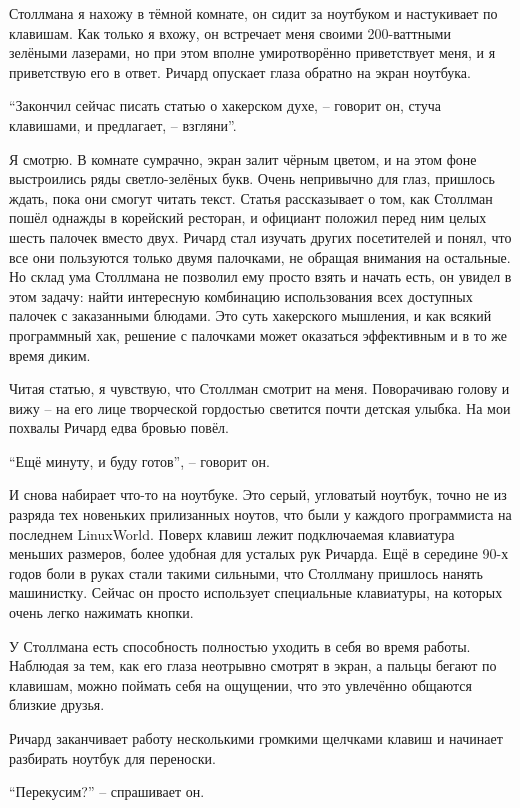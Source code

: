 Столлмана я нахожу в тёмной комнате, он сидит за ноутбуком и настукивает по клавишам. Как только я вхожу, он встречает меня своими 200-ваттными зелёными лазерами, но при этом вполне умиротворённо приветствует меня, и я приветствую его в ответ. Ричард опускает глаза обратно на экран ноутбука.

\enquote{Закончил сейчас писать статью о хакерском духе, -- говорит он, стуча клавишами, и предлагает, -- взгляни}.

Я смотрю. В комнате сумрачно, экран залит чёрным цветом, и на этом фоне выстроились ряды светло-зелёных букв. Очень непривычно для глаз, пришлось ждать, пока они смогут читать текст. Статья рассказывает о том, как Столлман пошёл однажды в корейский ресторан, и официант положил перед ним целых шесть палочек вместо двух. Ричард стал изучать других посетителей и понял, что все они пользуются только двумя палочками, не обращая внимания на остальные. Но склад ума Столлмана не позволил ему просто взять и начать есть, он увидел в этом задачу: найти интересную комбинацию использования всех доступных палочек с заказанными блюдами. Это суть хакерского мышления, и как всякий программный хак, решение с палочками может оказаться эффективным и в то же время диким.

Читая статью, я чувствую, что Столлман смотрит на меня. Поворачиваю голову и вижу -- на его лице творческой гордостью светится почти детская улыбка. На мои похвалы Ричард едва бровью повёл.

\enquote{Ещё минуту, и буду готов}, -- говорит он.

И снова набирает что-то на ноутбуке. Это серый, угловатый ноутбук, точно не из разряда тех новеньких прилизанных ноутов, что были у каждого программиста на последнем LinuxWorld. Поверх клавиш лежит подключаемая клавиатура меньших размеров, более удобная для усталых рук Ричарда. Ещё в середине 90-х годов боли в руках стали такими сильными, что Столлману пришлось нанять машинистку. Сейчас он просто использует специальные клавиатуры, на которых очень легко нажимать кнопки.

У Столлмана есть способность полностью уходить в себя во время работы. Наблюдая за тем, как его глаза неотрывно смотрят в экран, а пальцы бегают по клавишам, можно поймать себя на ощущении, что это увлечённо общаются близкие друзья.

Ричард заканчивает работу несколькими громкими щелчками клавиш и начинает разбирать ноутбук для переноски.

\enquote{Перекусим?} -- спрашивает он.

